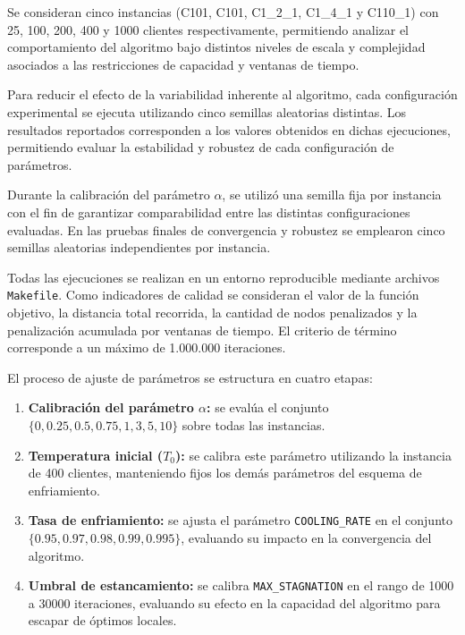 \documentclass[letter, 10pt, dvipdfmx]{article}
\begin{document}
Se consideran cinco instancias (C101, C101, C1\_2\_1, C1\_4\_1 y C110\_1) con 25, 100, 200, 400 y 1000 clientes respectivamente, permitiendo analizar el comportamiento del algoritmo bajo distintos niveles de escala y complejidad asociados a las restricciones de capacidad y ventanas de tiempo.

Para reducir el efecto de la variabilidad inherente al algoritmo, cada configuración experimental se ejecuta utilizando cinco semillas aleatorias distintas. Los resultados reportados corresponden a los valores obtenidos en dichas ejecuciones, permitiendo evaluar la estabilidad y robustez de cada configuración de parámetros.

Durante la calibración del parámetro $\alpha$, se utilizó una semilla fija por instancia con el fin de garantizar comparabilidad
entre las distintas configuraciones evaluadas. En las pruebas finales de convergencia y robustez se emplearon
cinco semillas aleatorias independientes por instancia.

Todas las ejecuciones se realizan en un entorno reproducible mediante archivos \texttt{Makefile}. Como indicadores de calidad se consideran el valor de la función objetivo, la distancia total recorrida, la cantidad de nodos penalizados y la penalización acumulada por ventanas de tiempo. El criterio de término corresponde a un máximo de 1.000.000 iteraciones.

El proceso de ajuste de parámetros se estructura en cuatro etapas:

\begin{enumerate}
  \item \textbf{Calibración del parámetro $\alpha$:} se evalúa el conjunto $\{0, 0.25, 0.5, 0.75, 1, 3, 5, 10\}$ sobre todas las instancias.

  \item \textbf{Temperatura inicial ($T_0$):} se calibra este parámetro utilizando la instancia de 400 clientes, manteniendo fijos los demás parámetros del esquema de enfriamiento.

  \item \textbf{Tasa de enfriamiento:} se ajusta el parámetro \texttt{COOLING\_RATE} en el conjunto $\{0.95, 0.97, 0.98, 0.99, 0.995\}$, evaluando su impacto en la convergencia del algoritmo.

  \item \textbf{Umbral de estancamiento:} se calibra \texttt{MAX\_STAGNATION} en el rango de 1000 a 30000 iteraciones, evaluando su efecto en la capacidad del algoritmo para escapar de óptimos locales.
\end{enumerate}
\end{document}
